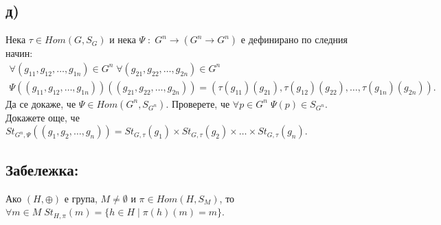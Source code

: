 \documentclass[a4paper, 12pt, oneside]{article}
\begin{document}
\subsection*{д)}
Нека \(\tau \in Hom(G, S_G)\) и нека \(\Psi \; : \; G^n \to (G^n \to G^n)\) е дефинирано по следния начин:
\begin{align*}
    \forall (g_{11}, g_{12}, \dots, g_{1n}) \in G^n \; \forall (g_{21}, g_{22}, \dots, g_{2n}) \in G^n \\
    \Psi((g_{11}, g_{12}, \dots, g_{1n}))((g_{21}, g_{22}, \dots, g_{2n})) = (\tau(g_{11})(g_{21}), \tau(g_{12})(g_{22}), \dots, \tau(g_{1n})(g_{2n})).
\end{align*}
Да се докаже, че \(\Psi \in Hom(G^n, S_{G^n})\).
Проверете, че \(\forall p \in G^n \; \Psi(p) \in S_{G^n}\). \\
Докажете още, че \(St_{G^n, \Psi}((g_1, g_2, \dots, g_n)) = St_{G, \tau}(g_1) \times St_{G, \tau}(g_2) \times \dots \times St_{G, \tau}(g_n)\).
\subsection*{Забележка:}
Ако \((H, \oplus)\) е група, \(M \neq \emptyset\) и \(\pi \in Hom(H, S_M)\), то \\
\(\forall m \in M \; St_{H, \pi}(m) = \{h \in H \; | \; \pi(h)(m) = m\}\).
\end{document}
